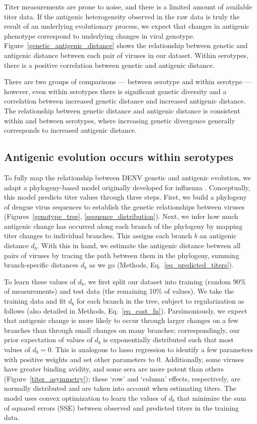 \documentclass[11pt,oneside,letterpaper]{article}
\begin{document}
Titer measurements are prone to noise, and there is a limited amount of available titer data.
If the antigenic heterogeneity observed in the raw data is truly the result of an underlying evolutionary process, we expect that changes in antigenic phenotype correspond to underlying changes in viral genotype.
Figure~\ref{genetic_antigenic_distance} shows the relationship between genetic and antigenic distance between each pair of viruses in our dataset.
Within serotypes, there is a positive correlation between genetic and antigenic distance.

There are two groups of comparisons --- between serotype and within serotype --- however, even within serotypes there is significant genetic diversity and a correlation between increased genetic distance and increased antigenic distance.
The relationship between genetic distance and antigenic distance is consistent within and between serotypes, where increasing genetic divergence generally corresponds to increased antigenic distance.

\subsection*{Antigenic evolution occurs within serotypes}
To fully map the relationship between DENV genetic and antigenic evolution, we adapt a phylogeny-based model originally developed for influenza \citep{neher2016prediction}.
Conceptually, this model predicts titer values through three steps.
First, we build a phylogeny of dengue virus sequences to establish the genetic relationships between viruses (Figures~\ref{genotype_tree}, \ref{sequence_distribution}).
Next, we infer how much antigenic change has occurred along each branch of the phylogeny by mapping titer changes to individual branches.
This assigns each branch $b$ an antigenic distance $d_b$.
With this in hand, we estimate the antigenic distance between all pairs of viruses by tracing the path between them in the phylogeny, summing branch-specific distances $d_b$ as we go (Methods, Eq.~\ref{eq_predicted_titers}).

To learn these values of $d_b$, we first split our dataset into training (random 90\% of measurements) and test data (the remaining 10\% of values).
We take the training data and fit $d_b$ for each branch in the tree, subject to regularization as follows (also detailed in Methods, Eq.~\ref{eq_cost_fn}).
Parsimoniously, we expect that antigenic change is more likely to occur through larger changes on a few branches than through small changes on many branches; correspondingly, our prior expectation of values of $d_b$ is exponentially distributed such that most values of $d_b = 0$.
This is analogous to lasso regression to identify a few parameters with positive weights and set other parameters to 0.
Additionally, some viruses have greater binding avidity, and some sera are more potent than others (Figure~\ref{titer_asymmetry}); these `row' and `column' effects, respectively, are normally distributed and are taken into account when estimating titers.
The model uses convex optimization to learn the values of $d_b$ that minimize the sum of squared errors (SSE) between observed and predicted titers in the training data.
\end{document}
